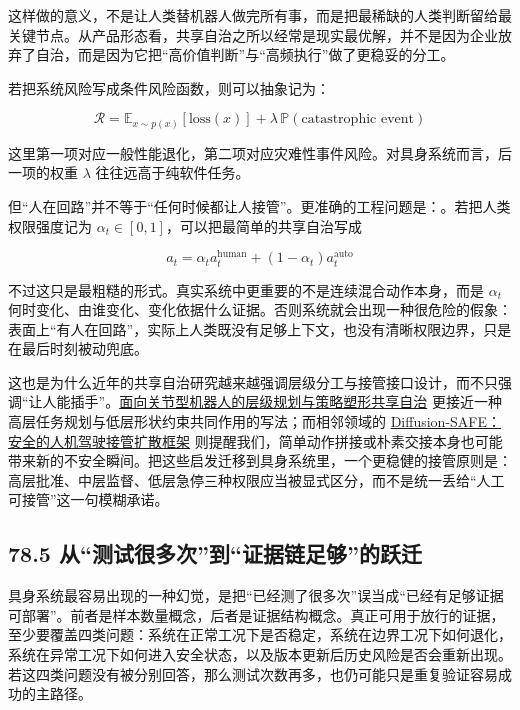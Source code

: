 这样做的意义，不是让人类替机器人做完所有事，而是把最稀缺的人类判断留给最关键节点。从产品形态看，共享自治之所以经常是现实最优解，并不是因为企业放弃了自治，而是因为它把“高价值判断”与“高频执行”做了更稳妥的分工。

若把系统风险写成条件风险函数，则可以抽象记为：

\begingroup
\scriptsize
\begin{equation*}
\mathcal{R} = \mathbb{E}_{x \sim p(x)}[\text{loss}(x)] + \lambda \, \mathbb{P}(\text{catastrophic event})
\end{equation*}
\endgroup

这里第一项对应一般性能退化，第二项对应灾难性事件风险。对具身系统而言，后一项的权重 \(\lambda\) 往往远高于纯软件任务。

但“人在回路”并不等于“任何时候都让人接管”。更准确的工程问题是：\texttt{}。若把人类权限强度记为 \(\alpha_t \in [0,1]\)，可以把最简单的共享自治写成

\begingroup
\footnotesize
\begin{equation*}
a_t = \alpha_t a_t^{\text{human}} + (1-\alpha_t) a_t^{\text{auto}}
\end{equation*}
\endgroup

不过这只是最粗糙的形式。真实系统中更重要的不是连续混合动作本身，而是 \(\alpha_t\) 何时变化、由谁变化、变化依据什么证据。否则系统就会出现一种很危险的假象：表面上“有人在回路”，实际上人类既没有足够上下文，也没有清晰权限边界，只是在最后时刻被动兜底。

这也是为什么近年的共享自治研究越来越强调层级分工与接管接口设计，而不只强调“让人能插手”。\href{https://arxiv.org/abs/2307.01943}{面向关节型机器人的层级规划与策略塑形共享自治} 更接近一种高层任务规划与低层形状约束共同作用的写法；而相邻领域的 \href{https://arxiv.org/abs/2505.09889}{Diffusion-SAFE：安全的人机驾驶接管扩散框架} 则提醒我们，简单动作拼接或朴素交接本身也可能带来新的不安全瞬间。把这些启发迁移到具身系统里，一个更稳健的接管原则是：高层批准、中层监督、低层急停三种权限应当被显式区分，而不是统一丢给“人工可接管”这一句模糊承诺。

\subsection*{78.5 从“测试很多次”到“证据链足够”的跃迁}


具身系统最容易出现的一种幻觉，是把“已经测了很多次”误当成“已经有足够证据可部署”。前者是样本数量概念，后者是证据结构概念。真正可用于放行的证据，至少要覆盖四类问题：系统在正常工况下是否稳定，系统在边界工况下如何退化，系统在异常工况下如何进入安全状态，以及版本更新后历史风险是否会重新出现。若这四类问题没有被分别回答，那么测试次数再多，也仍可能只是重复验证容易成功的主路径。

